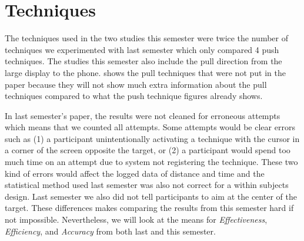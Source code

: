 \section*{Techniques}\label{sec:techniques}
The techniques used in the two studies this semester were twice the number of techniques we experimented with last semester which only compared 4 push techniques.
The studies this semester also include the pull direction from the large display to the phone.
 shows the pull techniques that were not put in the paper because they will not show much extra information about the pull techniques compared to what the push technique figures already shows.

In last semester's paper, the results were not cleaned for erroneous attempts which means that we counted all attempts. 
Some attempts would be clear errors such as (1) a participant unintentionally activating a technique with the cursor in a corner of the screen opposite the target, or (2) a participant would spend too much time on an attempt due to system not registering the technique.
These two kind of errors would affect the logged data of distance and time and the statistical method used last semester was also not correct for a within subjects design.
Last semester we also did not tell participants to aim at the center of the target.
These differences makes comparing the results from this semester hard if not impossible.
Nevertheless, we will look at the means for \textit{Effectiveness}, \textit{Efficiency}, and \textit{Accuracy} from both last and this semester.


